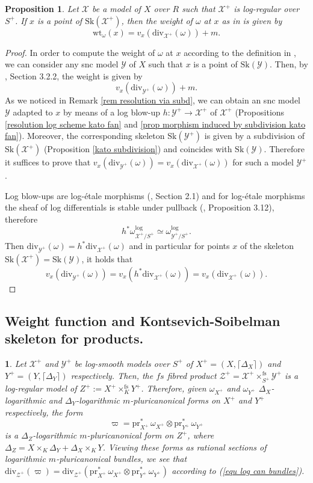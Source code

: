 \documentclass{amsart}%
\numberwithin{equation}{subsection}
\theoremstyle{plain2}
\newtheorem{prop}[equation]{Proposition}
\theoremstyle{definition2}
\theoremstyle{stepstyle}
\theoremstyle{point}
\theoremstyle{subpoint}
\newtheorem{subpoint}[equation]{}%
\newcommand{\spa}[1]{\begin{subpoint}#1\end{subpoint}}           %
\newcommand{\cX}{\ensuremath{\mathscr{X}}}
\newcommand{\cY}{\ensuremath{\mathscr{Y}}}
\newcommand{\cZ}{\ensuremath{\mathscr{Z}}}
\renewcommand{\cZ}{\ensuremath{\mathscr{Z}}}
\renewcommand{\cY}{\ensuremath{\mathscr{Y}}}
\newcommand{\pr}{\mathrm{pr}}
\newcommand{\divisor}{\mathrm{div}}
\newcommand{\weight}{\mathrm{wt}}
\newcommand{\Sk}{\mathrm{Sk}}
\begin{document}
\begin{prop} \label{prop weight function log formula}
Let $\cX$ be a model of $X$ over $R$ such that $\cX^+$ is log-regular over $S^+$. If $x$ is a point of $\Sk(\cX^+)$, then the weight of $\omega$ at $x$ as in \cite{MustataNicaise} is given by $$\weight_{\omega}(x)=v_x(\divisor_{\cX^+}(\omega)) +m.$$
\end{prop}
\begin{proof}
In order to compute the weight of $\omega$ at $x$ according to the definition in \cite{MustataNicaise}, we can consider any snc model $\cY$ of $X$ such that $x$ is a point of $\Sk(\cY)$. Then, by \cite{NicaiseXu}, Section 3.2.2, the weight is given by $$v_x(\divisor_{\cY^+}(\omega))+m.$$
As we noticed in Remark \ref{rem resolution via subd}, we can obtain an snc model $\cY$ adapted to $x$ by means of a log blow-up $h: \cY^+ \rightarrow \cX^+$ of $\cX^+$ (Propositions \ref{resolution log scheme kato fan} and \ref{prop morphism induced by subdivision kato fan}). Moreover, the corresponding skeleton $\Sk(\cY^+)$ is given by a subdivision of $\Sk(\cX^+)$ (Proposition \ref{kato subdivision}) and coincides with $\Sk(\cY)$. Therefore it suffices to prove that $v_x(\divisor_{\cY^+}(\omega)) =   v_x(\divisor_{\cX^+}(\omega))$ for such a model $\cY^+$.

Log blow-ups are log-\'{e}tale morphisms (\cite{Saito2004}, Section 2.1) and for log-\'{e}tale morphisms the sheaf of log differentials is stable under pullback (\cite{Kato1994a}, Proposition 3.12), therefore $$h^* \omega_{\cX^+/ S^+}^{\text{log}} \simeq \omega_{\cY^+/S^+}^{\text{log}}.$$ Then $\divisor_{\cY^+}(\omega)=h^* \divisor_{\cX^+}(\omega)$ and in particular for points $x$ of the skeleton $\Sk(\cX^+) = \Sk(\cY)$, it holds that $$v_{x}(\divisor_{\cY^+}(\omega))= v_{x}(h^*\divisor_{\cX^+}(\omega))= v_x(\divisor_{\cX^+}(\omega)).$$
\end{proof}


\subsection{Weight function and Kontsevich-Soibelman skeleton for products.} \label{paragraph weight function product}
\spa{Let $\cX^+$ and $\cY^+$ be log-smooth models over $S^+$ of $X^+=(X,\lceil\Delta_X\rceil)$ and $Y^+=(Y,\lceil\Delta_Y\rceil)$ respectively. Then, the $fs$ fibred product $\cZ^+=\cX^+  \times^{\text{fs}}_{S^+} \cY^+$ is a log-regular model of $Z^+:=X^+ \times^{\text{fs}}_K Y^+$. Therefore, given $\omega_{X^+}$ and $\omega_{Y^+}$ $\Delta_X$-logarithmic and $\Delta_Y$-logarithmic $m$-pluricanonical forms on $X^+$ and $Y^+$ respectively, the form $$\varpi=\pr_{X^+}^* \,\omega_{X^+} \otimes \pr_{Y^+}^* \,\omega_{Y^+}$$ is a $\Delta_Z$-logarithmic $m$-pluricanonical form on $Z^+$, where $\Delta_Z= X \times_K \Delta_Y + \Delta_X \times_K Y$. Viewing these forms as rational sections of logarithmic $m$-pluricanonical bundles, we see that $\divisor_{\cZ^+}(\varpi)=\divisor_{\cZ^+}( \pr_{X^+}^* \,\omega_{X^+} \otimes \pr_{Y^+}^* \,\omega_{Y^+})$ according to (\ref{equ log can bundles}).}
\end{document}
